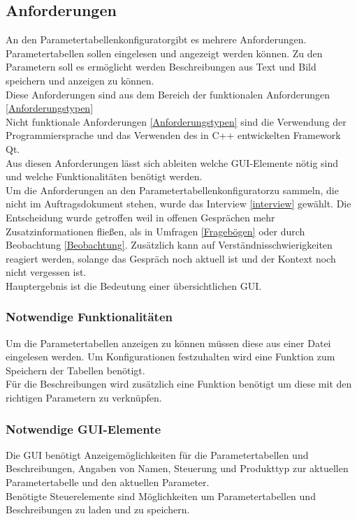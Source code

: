 \documentclass[12pt,a4paper]{article}
\begin{document}
\subsection{Anforderungen}
\label{Anfs} 
An den \glqq Parametertabellenkonfigurator\grqq\space gibt es mehrere Anforderungen. \\
Parametertabellen sollen eingelesen und angezeigt werden können. Zu den Parametern soll es ermöglicht werden Beschreibungen aus Text und Bild speichern und anzeigen zu können.\\
Diese Anforderungen sind aus dem Bereich der funktionalen Anforderungen \ref{Anforderungstypen}\\
Nicht funktionale Anforderungen \ref{Anforderungstypen} sind die Verwendung der Programmiersprache und das Verwenden des in C++ entwickelten Framework Qt.\\
Aus diesen Anforderungen lässt sich ableiten welche \ac{GUI}-Elemente nötig sind und welche Funktionalitäten benötigt werden.\\
Um die Anforderungen an den \glqq Parametertabellenkonfigurator\grqq\space zu sammeln, die nicht im Auftragsdokument stehen, wurde das Interview \ref{interview} gewählt. Die Entscheidung wurde getroffen weil in offenen Gesprächen mehr Zusatzinformationen fließen, als in Umfragen \ref{Fragebögen} oder durch Beobachtung \ref{Beobachtung}. Zusätzlich kann auf Verständnisschwierigkeiten reagiert werden, solange das Gespräch noch aktuell ist und der Kontext noch nicht vergessen ist.\\
Hauptergebnis ist die Bedeutung einer übersichtlichen \ac{GUI}.
\subsubsection{Notwendige Funktionalitäten}
Um die Parametertabellen anzeigen zu können müssen diese aus einer Datei eingelesen werden. Um Konfigurationen festzuhalten wird eine Funktion zum Speichern der Tabellen benötigt. \\
Für die Beschreibungen wird zusätzlich eine Funktion benötigt um diese mit den richtigen Parametern zu verknüpfen. \\
\subsubsection{Notwendige GUI-Elemente}
Die \ac{GUI} benötigt Anzeigemöglichkeiten für die Parametertabellen und Beschreibungen, Angaben von Namen, Steuerung und Produkttyp zur aktuellen Parametertabelle und den aktuellen Parameter.\\
Benötigte Steuerelemente sind Möglichkeiten um Parametertabellen und Beschreibungen zu laden und zu speichern. 
\end{document}
